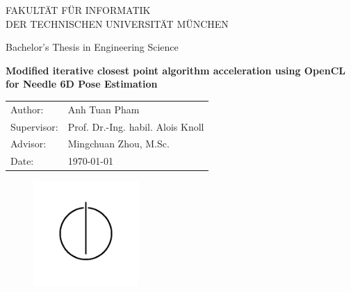 



\thispagestyle{empty}

\vspace{7mm}
\begin{center}
  \oTUM{4cm}

  \vspace{5mm}
  \huge FAKULT{\"A}T F{\"U}R INFORMATIK\\
  \vspace{0.5cm}
  \large DER TECHNISCHEN UNIVERSIT{\"A}T M{\"U}NCHEN
\end{center}
\vspace{7mm}
\begin{center}

  {\Large Bachelor's Thesis in Engineering Science}

  \vspace{7mm}

  {\LARGE \textbf{Modified iterative closest point algorithm acceleration using OpenCL for Needle 6D Pose Estimation}}\\

  \vspace{5mm}

  \vspace{10mm}

  \begin{tabular}{ll}
    \Large Author:     & \Large Anh Tuan Pham \\[2mm]
    \Large Supervisor:    & \Large Prof. Dr.-Ing. habil. Alois Knoll\\[2mm]
    \Large Advisor:	& \Large Mingchuan Zhou, M.Sc.\\[2mm]
    \Large Date:       & \Large \today
  \end{tabular}

  \vspace{5mm}

   \begin{figure}[h!]
     \centering
     \includegraphics[width=4cm]{styles/informat.png}
   \end{figure}

  \vspace{10mm}

\end{center}

